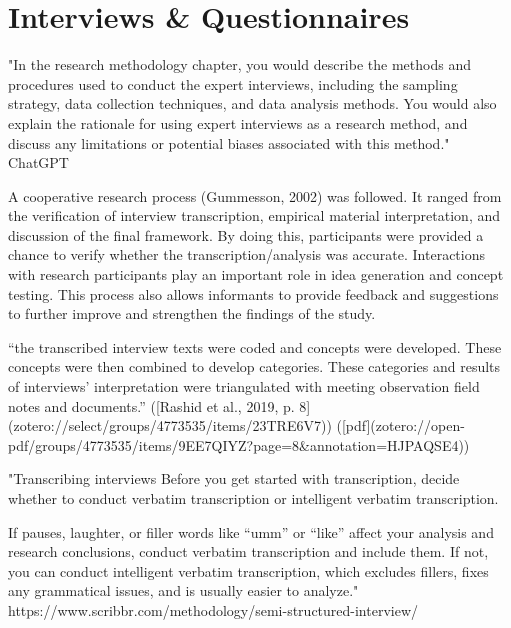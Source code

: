 
\section{Interviews & Questionnaires}
"In the research methodology chapter, you would describe the methods and procedures used to conduct the expert interviews, including the sampling strategy, data collection techniques, and data analysis methods. You would also explain the rationale for using expert interviews as a research method, and discuss any limitations or potential biases associated with this method." ChatGPT


A cooperative research process (Gummesson, 2002) was followed. It ranged from the verification of interview transcription, empirical material interpretation, and discussion of the final framework. By doing this, participants were provided a chance to verify whether the transcription/analysis was accurate. Interactions with research participants play an important role in idea generation and concept testing. This process also allows informants to provide feedback and suggestions to further improve and strengthen the findings of the study.

“the transcribed interview texts were coded and concepts were developed. These concepts were then combined to develop categories. These categories and results of interviews’ interpretation were triangulated with meeting observation field notes and documents.” ([Rashid et al., 2019, p. 8](zotero://select/groups/4773535/items/23TRE6V7)) ([pdf](zotero://open-pdf/groups/4773535/items/9EE7QIYZ?page=8&annotation=HJPAQSE4))


"Transcribing interviews
Before you get started with transcription, decide whether to conduct verbatim transcription or intelligent verbatim transcription.

If pauses, laughter, or filler words like “umm” or “like” affect your analysis and research conclusions, conduct verbatim transcription and include them.
If not, you can conduct intelligent verbatim transcription, which excludes fillers, fixes any grammatical issues, and is usually easier to analyze." https://www.scribbr.com/methodology/semi-structured-interview/


